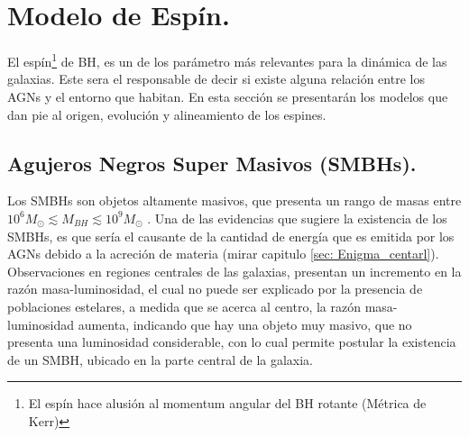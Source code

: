 \begin{savequote}[50mm]
\end{savequote}




\chapter{Modelo de Espín.}
\label{cha:Modelo de Spin}

El espín\footnote{El espín hace alusión al momentum angular del BH  rotante (Métrica de Kerr)} de BH, es un de los parámetro más relevantes para la dinámica de las galaxias. Este sera el responsable de decir si existe alguna relación entre los AGNs y el entorno que habitan. En esta sección se presentarán los modelos que dan pie al origen, evolución y  alineamiento de los espines.

\section{Agujeros Negros Super Masivos (SMBHs).}
\label{sec: SMBH}
Los SMBHs son objetos altamente masivos, que presenta un rango de masas entre $10^6M_{\odot}\lesssim M_{BH} \lesssim 10^{9}M_{\odot}$ \cite{mo2010}. Una de las evidencias que sugiere la existencia de los SMBHs, es que sería el causante de la cantidad de energía que es emitida por los AGNs debido a la acreción de materia (mirar capitulo \ref{sec: Enigma_centarl}). Observaciones en regiones centrales de las galaxias, presentan un incremento en la razón masa-luminosidad, el cual no puede ser explicado por la presencia de poblaciones estelares, a medida que se acerca al centro, la razón masa-luminosidad aumenta, indicando que hay una objeto muy masivo, que no presenta una luminosidad considerable, con lo cual permite postular la existencia de un SMBH, ubicado en la parte central de la galaxia.  

